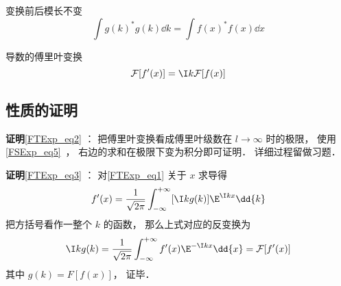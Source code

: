 变换前后模长不变
\begin{equation}\label{FTExp_eq2}
\int g(k)^* g(k) \dd{k} = \int f(x)^* f(x) \dd{x}
\end{equation}

导数的傅里叶变换
\begin{equation}\label{FTExp_eq3}
\mathcal F [f'(x)] = \I k \mathcal F[f(x)]
\end{equation}

\subsection{性质的证明}

\textbf{证明}\autoref{FTExp_eq2} ： 把傅里叶变换看成傅里叶级数在 $l \to \infty$ 时的极限， 使用\autoref{FSExp_eq5}~， 右边的求和在极限下变为积分即可证明． 详细过程留做习题．

\textbf{证明}\autoref{FTExp_eq3} ： 对\autoref{FTExp_eq1} 关于 $x$ 求导得
\begin{equation}
f'(x) = \frac{1}{\sqrt{2\pi }} \int_{-\infty }^{+\infty } [\I kg(k)]\E^{\I kx} \dd{k}
\end{equation}
把方括号看作一整个 $k$ 的函数， 那么上式对应的反变换为
\begin{equation}
\I kg(k) = \frac{1}{\sqrt{2\pi }} \int_{-\infty }^{+\infty } f'(x) \E^{-\I kx} \dd{x} = \mathcal F [f'(x)]
\end{equation}
其中 $g(k) = F [f(x)]$， 证毕．
